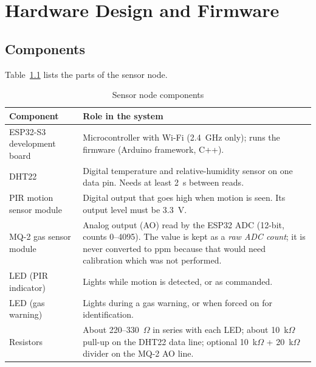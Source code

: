 \documentclass[12pt,a4paper,oneside]{report}
\begin{document}
\chapter{Hardware Design and Firmware}
\label{ch:hardware}

\begin{center}
\end{center}

\section{Components}
Table~\ref{tab:components} lists the parts of the sensor node.
\begin{table}[H]
\centering
\caption{Sensor node components}
\label{tab:components}
\begin{tabularx}{\textwidth}{lX}
\toprule
\textbf{Component} & \textbf{Role in the system}\\
\midrule
ESP32-S3 development board~\cite{esp32s3} & Microcontroller with Wi-Fi (2.4~GHz only); runs the firmware (Arduino framework, C++).\\
DHT22~\cite{dht22} & Digital temperature and relative-humidity sensor on one data pin. Needs at least 2~s between reads.\\
PIR motion sensor module & Digital output that goes high when motion is seen. Its output level must be 3.3~V.\\
MQ-2 gas sensor module & Analog output (AO) read by the ESP32 ADC (12-bit, counts 0--4095). The value is kept as a \emph{raw ADC count}; it is never converted to ppm because that would need calibration which was not performed.\\
LED (PIR indicator) & Lights while motion is detected, or as commanded.\\
LED (gas warning) & Lights during a gas warning, or when forced on for identification.\\
Resistors & About 220--330~$\Omega$ in series with each LED; about 10~k$\Omega$ pull-up on the DHT22 data line; optional 10~k$\Omega$ + 20~k$\Omega$ divider on the MQ-2 AO line.\\
\bottomrule
\end{tabularx}
\end{table}
\end{document}
